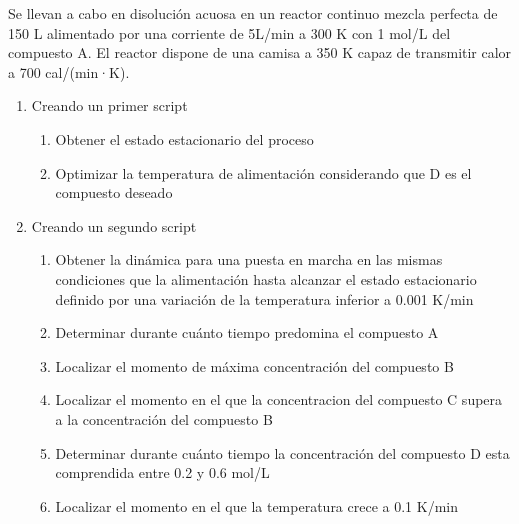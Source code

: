 \documentclass{report}
\begin{document}
\begin{raggedright}
{Se llevan a cabo en disolución acuosa en un reactor continuo mezcla perfecta de 150 L alimentado por una corriente de 5L/min a 300 K con 1 mol/L  del compuesto A.
El reactor dispone de una camisa a 350 K capaz de transmitir calor a 700 cal/(min·K).

\begin{enumerate}[label=\bfseries\scriptsize\protect\circled{\footnotesize\Alph*}]
	\item Creando un primer script 
	 	\begin{enumerate}[label=\bfseries\tiny\protect\circled{\small\arabic*}]
			\item Obtener el estado estacionario del proceso
			\item Optimizar la temperatura de alimentación considerando que D es el compuesto deseado
		\end{enumerate}
	\item Creando un segundo script
		\begin{enumerate}[label=\bfseries\tiny\protect\circled{\small\arabic*}]
			\item Obtener la dinámica para una puesta en marcha en las mismas condiciones que la alimentación hasta alcanzar el estado estacionario 
			definido por una variación de la temperatura inferior a 0.001 K/min
			\item Determinar durante cuánto tiempo predomina el compuesto A
			\item Localizar el momento de máxima concentración del compuesto B
			\item Localizar el momento en el que la concentracion del compuesto C supera a la concentración del compuesto B
			\item Determinar durante cuánto tiempo la concentración del compuesto D esta comprendida entre 0.2 y 0.6 mol/L 
			\item Localizar el momento en el que la temperatura crece a 0.1 K/min 
		\end{enumerate}
\end{enumerate}}

\end{raggedright}
\end{document}
